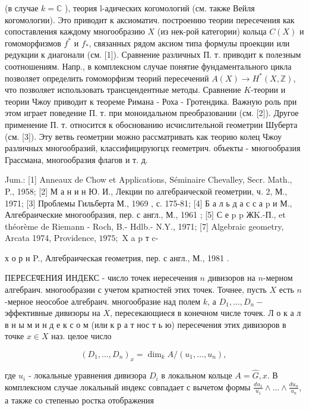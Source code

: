 \documentclass[10pt]{article}
\begin{document}
(в случае $k=\mathbb{C}$ ), теория l-адических когомологий (см. также Вейля когомологии). Это приводит к аксиоматич. построению теории пересечения как сопоставления каждому многообразию $X$ (из нек-рой категории) кольца $C(X)$ и гомоморфизмов $f^{*}$ и $f_{*}$, связанных рядом аксиом типа формулы проекции или редукции к диагонали (см. [1]). Сравнение различных П. т. приводит к полезным соотношениям. Напр., в комплексном случае понятие фундаментального цикла позволяет определить гомоморфизм теорий пересечений $A(X) \rightarrow H^{*}(X, \mathbb{Z})$, что позволяет использовать трансцендентные методы. Сравнение $K$-теории и теории Чжоу приводит к теореме Римана - Роха - Гротендика. Важную роль при этом играет поведение П. т. при моноидальном преобразовании (см. [2]). Другое применение П. т. относится к обоснованию исчислительной геометрии Шуберта (см. [3]). Эту ветвь геометрии можно рассматривать как теорию колец Чжоу различных многообразий, классифицируюгцх геометрич. объекты - многообразия Грассмана, многообразия флагов и т. д.



Jum.: [1] Anneaux de Chow et Applications, Séminaire Chevalley, Secr. Math., P., 1958; [2] М а н и н Ю. И., Лекции по алгебраической геометрии, ч. 2, М., 1971; [3] Проблемы Гильберта М., 1969 , с. 175-81; [4] Б а л ь д а с с а p и М., Алгебраические многообразия, пер. с англ., М., 1961 ; [5] С е p p ЖK.-П., et théorème de Riemann - Roch, B.- Hdlb.- N.Y., 1971; [7] Algebraic geometry, Arcata 1974, Providence, $1975 ;$ X a p т c-

х о р н P., Алгебраическая геометрия, пер. с англ., М., 1981 .



ПЕРЕСЕपЕНИЯ ИНДЕКС - число точек иересечения $n$ дивизоров на $n$-мерном алгебраич. многообразии с учетом кратностей этих точек. Точнее, пусть $X$ есть $n$-мерное неособое алгебраич. многообразие над полем $k$, а $D_{1}, \ldots, D_{n}-$ эффективные дивизоры на $X$, пересекающиеся в конечном числе точек. Л о к а л в н ы м и н д е к с о м (или к р а т нос т ь ю) пересечения этих дивизоров в точке $x \in X$ наз. целое число



\[

\left(D_{1}, \ldots, D_{n}\right)_{x}=\operatorname{dim}_{k} A /\left(u_{1}, \ldots, u_{n}\right) \text {, }

\]



где $u_{i}$ - локальные уравнения дивизора $D_{i}$ в локальном кольце $A=\widehat{G}, x$. В комплексном случае локальный индекс совпадает с вычетом формы $\frac{d u_{1}}{u_{1}} \wedge \ldots \wedge \frac{d u_{n}}{u_{n}}$, а также со степенью ростка отображения
\end{document}
